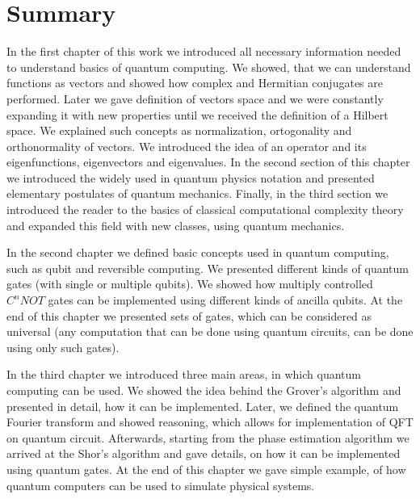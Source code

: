 \chapter{Summary}
\thispagestyle{chapterBeginStyle}

In the first chapter of this work we introduced all necessary information needed to understand basics of quantum computing. We showed, that we can understand functions as vectors and showed how complex and Hermitian conjugates are performed. Later we gave definition of vectors space and we were constantly expanding it with new properties until we received the definition of a Hilbert space. We explained such concepts as normalization, ortogonality and orthonormality of vectors. We introduced the idea of an operator and its eigenfunctions, eigenvectors and eigenvalues. In the second section of this chapter we introduced the widely used in quantum physics notation and presented elementary postulates of quantum mechanics. Finally, in the third section we introduced the reader to the basics of classical computational complexity theory and expanded this field with new classes, using quantum mechanics.

In the second chapter we defined basic concepts used in quantum computing, such as qubit and reversible computing. We presented different kinds of quantum gates (with single or multiple qubits). We showed how multiply controlled $C^n NOT$ gates can be implemented using different kinds of ancilla qubits. At the end of this chapter we presented sets of gates, which can be considered as universal (any computation that can be done using quantum circuits, can be done using only such gates).

In the third chapter we introduced three main areas, in which quantum computing can be used. We showed the idea behind the Grover's algorithm and presented in detail, how it can be implemented. Later, we defined the quantum Fourier transform and showed reasoning, which allows for implementation of QFT on quantum circuit. Afterwards, starting from the phase estimation algorithm we arrived at the Shor's algorithm and gave details, on how it can be implemented using quantum gates. At the end of this chapter we gave simple example, of how quantum computers can be used to simulate physical systems. 



